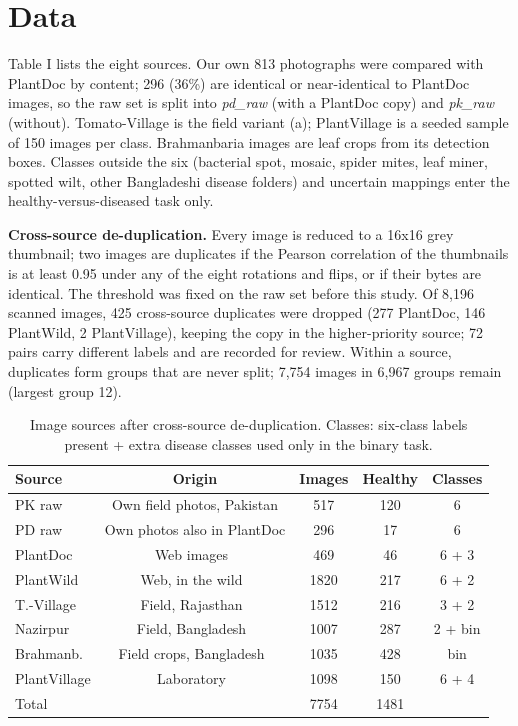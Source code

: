 \documentclass[conference]{IEEEtran}
\begin{document}
\section{Data}
Table I lists the eight sources. Our own 813 photographs were compared with PlantDoc by content; 296 (36\%) are identical or near-identical to PlantDoc images, so the raw set is split into \emph{pd\_raw} (with a PlantDoc copy) and \emph{pk\_raw} (without). Tomato-Village is the field variant (a); PlantVillage is a seeded sample of 150 images per class. Brahmanbaria images are leaf crops from its detection boxes. Classes outside the six (bacterial spot, mosaic, spider mites, leaf miner, spotted wilt, other Bangladeshi disease folders) and uncertain mappings enter the healthy-versus-diseased task only.

\textbf{Cross-source de-duplication.} Every image is reduced to a 16x16 grey thumbnail; two images are duplicates if the Pearson correlation of the thumbnails is at least 0.95 under any of the eight rotations and flips, or if their bytes are identical. The threshold was fixed on the raw set before this study. Of 8,196 scanned images, 425 cross-source duplicates were dropped (277 PlantDoc, 146 PlantWild, 2 PlantVillage), keeping the copy in the higher-priority source; 72 pairs carry different labels and are recorded for review. Within a source, duplicates form groups that are never split; 7,754 images in 6,967 groups remain (largest group 12).

\begin{table}[t]
\centering
\caption{Image sources after cross-source de-duplication. Classes: six-class labels present + extra disease classes used only in the binary task.}
\label{tab:sources}
\footnotesize
\begin{tabular}{lcccc}
\toprule
\textbf{Source} & \textbf{Origin} & \textbf{Images} & \textbf{Healthy} & \textbf{Classes} \\
\midrule
PK raw & Own field photos, Pakistan & 517 & 120 & 6 \\
PD raw & Own photos also in PlantDoc & 296 & 17 & 6 \\
PlantDoc & Web images~\cite{r6} & 469 & 46 & 6 + 3 \\
PlantWild & Web, in the wild~\cite{r8} & 1820 & 217 & 6 + 2 \\
T.-Village & Field, Rajasthan~\cite{r7} & 1512 & 216 & 3 + 2 \\
Nazirpur & Field, Bangladesh~\cite{r10} & 1007 & 287 & 2 + bin \\
Brahmanb. & Field crops, Bangladesh~\cite{r11} & 1035 & 428 & bin \\
PlantVillage & Laboratory~\cite{r1} & 1098 & 150 & 6 + 4 \\
Total &  & 7754 & 1481 &  \\
\bottomrule
\end{tabular}
\end{table}
\end{document}
